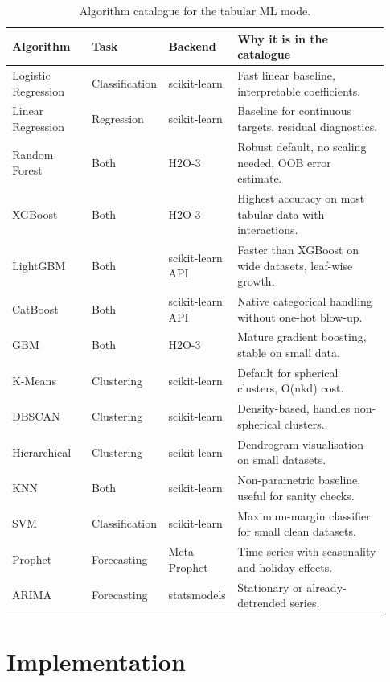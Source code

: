 \documentclass[12pt, a4paper, oneside]{report}
\begin{document}
\begin{table}[H]
\centering
\caption{Algorithm catalogue for the tabular ML mode.}
\label{tab:ml_algos}
\begin{tabular}{|L{0.21\linewidth}|L{0.16\linewidth}|L{0.16\linewidth}|L{0.4\linewidth}|}
\hline
\textbf{Algorithm} & \textbf{Task} & \textbf{Backend} & \textbf{Why it is in the catalogue} \\
\hline
Logistic Regression & Classification & scikit-learn & Fast linear baseline, interpretable coefficients. \\ \hline
Linear Regression & Regression & scikit-learn & Baseline for continuous targets, residual diagnostics. \\ \hline
Random Forest & Both & H2O-3 & Robust default, no scaling needed, OOB error estimate. \\ \hline
XGBoost & Both & H2O-3 & Highest accuracy on most tabular data with interactions. \\ \hline
LightGBM & Both & scikit-learn API & Faster than XGBoost on wide datasets, leaf-wise growth. \\ \hline
CatBoost & Both & scikit-learn API & Native categorical handling without one-hot blow-up. \\ \hline
GBM & Both & H2O-3 & Mature gradient boosting, stable on small data. \\ \hline
K-Means & Clustering & scikit-learn & Default for spherical clusters, O(nkd) cost. \\ \hline
DBSCAN & Clustering & scikit-learn & Density-based, handles non-spherical clusters. \\ \hline
Hierarchical & Clustering & scikit-learn & Dendrogram visualisation on small datasets. \\ \hline
KNN & Both & scikit-learn & Non-parametric baseline, useful for sanity checks. \\ \hline
SVM & Classification & scikit-learn & Maximum-margin classifier for small clean datasets. \\ \hline
Prophet & Forecasting & Meta Prophet & Time series with seasonality and holiday effects. \\ \hline
ARIMA & Forecasting & statsmodels & Stationary or already-detrended series. \\
\hline
\end{tabular}
\end{table}

\section{Implementation}
\end{document}
